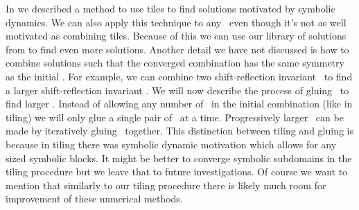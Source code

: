 


In  we described a method to use tiles
to find solutions motivated by symbolic dynamics. We can also
apply this technique to any \twots\ even though it's not as
well motivated as combining tiles. Because of this
we can use our library of solutions from 
to find even more solutions. Another detail we have not discussed is
how to combine solutions such that the converged combination has
the same symmetry as the initial \twots. For example, we can
combine two shift-reflection invariant \twots\ to find a larger
shift-reflection invariant \twot. We will
now describe the process of gluing \twots\ to find larger \twots.
Instead of allowing any number of \twots\ in the initial combination
(like in tiling) we will only glue a single pair of \twots\ at a
time. Progressively larger \twots\ can be made by iteratively gluing
\twots\ together. This distinction between tiling and gluing is because
in tiling there was symbolic dynamic motivation which allows for
any sized symbolic blocks. It might be better to converge symbolic
subdomains in the tiling procedure but we leave that to future
investigations. Of course we want to mention that similarly to our tiling procedure
there is likely much room for improvement of these numerical methods.

